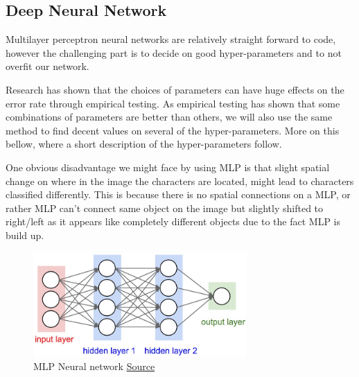 \documentclass[Report.tex]{subfiles}
\begin{document}
  \begin{flushleft}
    \subsection{Deep Neural Network}
    \label{Recognition:subsec:MLP}
    Multilayer perceptron neural networks are relatively straight
    forward to code, however the challenging part is to decide on good hyper-parameters and to not overfit our network. \par
    Research has shown that the choices of parameters can have huge effects on the error rate through empirical testing. As empirical testing has shown that some combinations of parameters are better than others, we will also use the same method to find decent values on several of the hyper-parameters. More on this bellow, where a short description of the hyper-parameters follow. \par
    One obvious disadvantage we might face by using MLP is that slight spatial change on where in the image the characters are located, might lead to characters classified differently. This is because there is no spatial connections on a MLP, or rather MLP can't connect same object on the image but slightly shifted to right/left as it appears like completely different objects due to the fact MLP is build up.
  \end{flushleft}

  \begin{figure}[H]
    \centering
    \includegraphics[height=4cm]{res/neural_net2.jpeg}
    \caption{MLP Neural network \href{http://cs231n.github.io/neural-networks-1/}{Source}}
    \label{fig:neural_net2}
  \end{figure}
\end{document}
